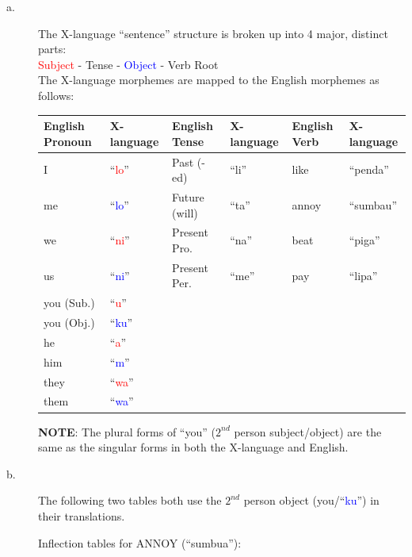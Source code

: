 \documentclass[11pt]{article}
\begin{document}
\newpage

\begin{solution}

\begin{description}
\item[a.] The X-language ``sentence'' structure is broken up into 4 major, distinct parts: \\
\textcolor{red}{Subject} - \textcolor{OliveGreen}{Tense} - \textcolor{blue}{Object} - \textcolor{BurntOrange}{Verb Root} \\
The X-language morphemes are mapped to the English morphemes as follows:

\begin{tabular}{l l | l l | l l}
English Pronoun & X-language & English Tense & X-language & English Verb & X-language \\ \hline 
I & ``\textcolor{red}{lo}'' & Past (-ed) & ``\textcolor{OliveGreen}{li}'' & like & ``\textcolor{BurntOrange}{penda}'' \\
me & ``\textcolor{blue}{lo}'' & Future (will) & ``\textcolor{OliveGreen}{ta}'' & annoy & ``\textcolor{BurntOrange}{sumbau}'' \\
we & ``\textcolor{red}{ni}'' & Present Pro. & ``\textcolor{OliveGreen}{na}'' & beat & ``\textcolor{BurntOrange}{piga}'' \\
us & ``\textcolor{blue}{ni}'' & Present Per. & ``\textcolor{OliveGreen}{me}'' & pay & ``\textcolor{BurntOrange}{lipa}'' \\
you (Sub.) & ``\textcolor{red}{u}'' & & & &  \\
you (Obj.) & ``\textcolor{blue}{ku}'' & & & & \\
he & ``\textcolor{red}{a}'' & & & & \\
him & ``\textcolor{blue}{m}'' & & & & \\
they & ``\textcolor{red}{wa}'' & & & & \\
them & ``\textcolor{blue}{wa}'' & & & & \\
\end{tabular}

\textbf{NOTE}: The plural forms of ``you'' ($2^{nd}$ person subject/object) are the same as the singular forms in both the X-language and English.

\item[b.] The following two tables both use the $2^{nd}$ person object (you/``\textcolor{blue}{ku}'') in their translations.

Inflection tables for ANNOY (``\textcolor{BurntOrange}{sumbua}''):


\end{description}
\end{solution}
\end{document}
